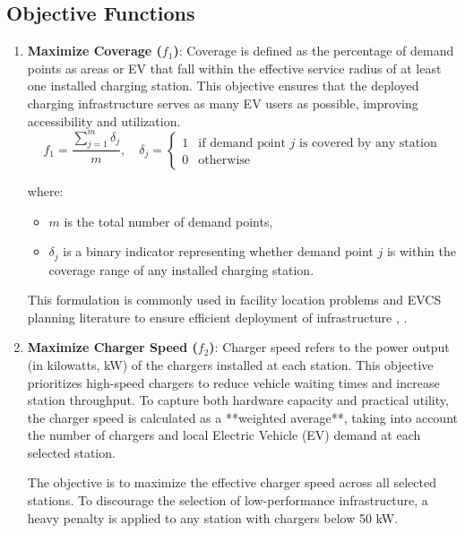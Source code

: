 \subsection{Objective Functions}
\begin{enumerate}
    \item \textbf{Maximize Coverage ($f_1$)}: Coverage is defined as the percentage of demand points as areas or EV that fall within the effective service radius of at least one installed charging station. This objective ensures that the deployed charging infrastructure serves as many EV users as possible, improving accessibility and utilization.
    \[
    f_1 = \frac{\sum_{j=1}^{m} \delta_j}{m}, \quad \delta_j = \begin{cases}
    1 & \text{if demand point } j \text{ is covered by any station} \\
    0 & \text{otherwise}
    \end{cases}
    \]

    where:
    \begin{itemize}
        \item \( m \) is the total number of demand points,
        \item \( \delta_j \) is a binary indicator representing whether demand point \( j \) is within the coverage range of any installed charging station.
    \end{itemize}
    This formulation is commonly used in facility location problems and EVCS planning literature to ensure efficient deployment of infrastructure \cite{A multi-objective optimization model for electric vehicle charging station location planning}, \cite{Multi-objective evolutionary algorithms for solving the electric vehicle charging station infrastructure problem}.

    \item \textbf{Maximize Charger Speed ($f_2$)}:  
    Charger speed refers to the power output (in kilowatts, kW) of the chargers installed at each station. This objective prioritizes high-speed chargers to reduce vehicle waiting times and increase station throughput. To capture both hardware capacity and practical utility, the charger speed is calculated as a **weighted average**, taking into account the number of chargers and local Electric Vehicle (EV) demand at each selected station.
    
    The objective is to maximize the effective charger speed across all selected stations. To discourage the selection of low-performance infrastructure, a heavy penalty is applied to any station with chargers below 50 kW.
    

\end{enumerate}
